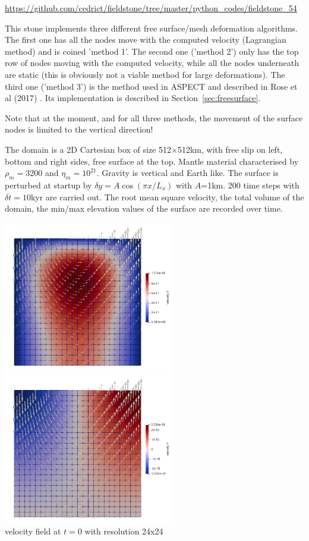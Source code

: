 \url{https://github.com/cedrict/fieldstone/tree/master/python_codes/fieldstone_54}

\vspace{1cm}

This stone implements three different free surface/mesh deformation algorithms. 
The first one has all the nodes move with the computed velocity (Lagrangian method)
and is coined 'method 1'. 
The second one ('method 2') only has the top row of nodes moving with the computed velocity, 
while all the nodes underneath are static (this is obviously not a viable method for 
large deformations). 
The third one ('method 3') is the method used in ASPECT and described in Rose et al (2017) \cite{robh17}.
Its implementation is described in Section~\ref{sec:freesurface}.

Note that at the moment, and for all three methods, the movement of the surface nodes is limited 
to the vertical direction!

The domain is a 2D Cartesian box of size 512$\times$512km, with free slip on left, 
bottom and right sides, free surface at the top. 
Mantle material characterised by $\rho_m=3200$ and $\eta_m=10^{21}$. 
Gravity is vertical and Earth like. 
The surface is perturbed at startup by $\delta y = A \cos (\pi x /L_x)$ with $A$=1km.
200 time steps with $\delta t=10$kyr are carried out.
The root mean square velocity, the total volume of the domain, the min/max elevation
values of the surface are recorded over time. 

\begin{center}
\includegraphics[width=7.5cm]{python_codes/fieldstone_54/images/u}
\includegraphics[width=7.5cm]{python_codes/fieldstone_54/images/v}\\
{\scriptsize velocity field at $t=0$ with resolution 24x24}
\end{center}

